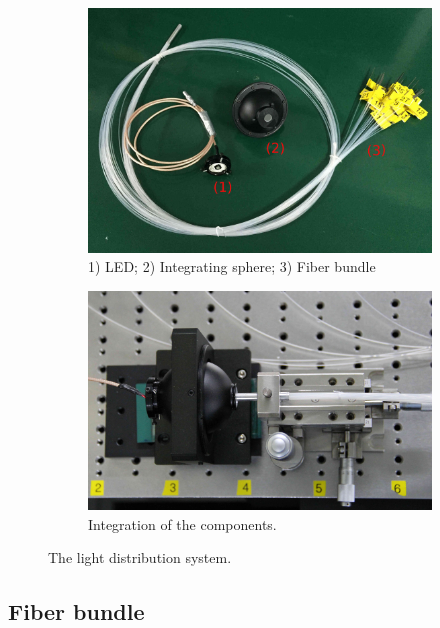 \documentclass{JINST}
\begin{document}
\begin{figure}[tbp]
	
	\begin{subfigure}[t]{0.5\textwidth}
		\includegraphics[width=0.98\linewidth]{fibre_led_insphere_crop.jpg}
		\caption{1) LED; 2) Integrating sphere; 3) Fiber bundle}
		\label{fig:FIG3_a}
	\end{subfigure}
	\begin{subfigure}[t]{0.5\textwidth}
		\includegraphics[width=0.98\linewidth]{light_source1_crop.jpg}
		\caption{Integration of the components.}
		\label{fig:FIG3_b}
	\end{subfigure}
	
	\caption{The light distribution system.}
	\label{fig:FIG_tmp}
\end{figure}

\subsection{Fiber bundle}
\label{sec:fiber_bundle}
	
\end{document}
